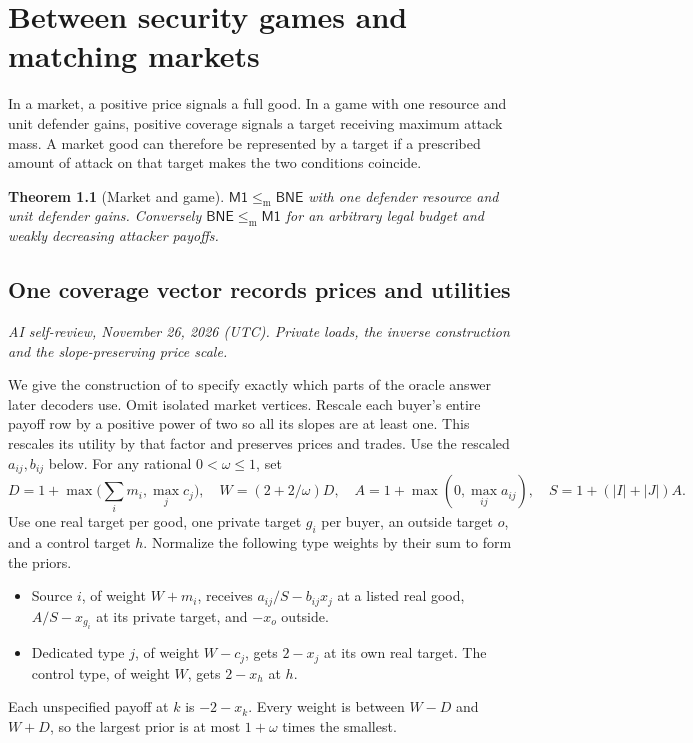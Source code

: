 \documentclass[11pt,oneside,openany,notitlepage]{report}
\newtheorem{theorem}{Theorem}[chapter]
\newcommand{\Market}{\mathsf{M1}}
\newcommand{\BNE}{\mathsf{BNE}}
\newcommand{\dd}{\mathrel{\leq_{\mathrm m}}}
\newcommand{\reviewdate}{November 26, 2026 (UTC)}
\newcommand{\reviewmark}[1]{\par\nopagebreak[4]\noindent
  {\footnotesize\itshape AI self-review, \reviewdate. #1\par}\nobreak\smallskip}
\begin{document}
\chapter{Between security games and matching markets}\label{sec:bridge}

In a market, a positive price signals a full good. In a game with one
resource and unit defender gains, positive coverage signals a target
receiving maximum attack mass. A market good can therefore be represented
by a target if a prescribed amount of attack on that target makes the two
conditions coincide.

\begin{theorem}[Market and game]\label{thm:bridge}
\(\Market\dd\BNE\) with one defender resource and unit defender gains.
Conversely \(\BNE\dd\Market\) for an arbitrary legal budget and weakly
decreasing attacker payoffs.
\end{theorem}

\section{One coverage vector records prices and utilities}
\reviewmark{Private loads, the inverse construction and the slope-preserving price scale.}

We give the construction of \cite[Theorem~3.16]{book} to specify exactly
which parts of the oracle answer later decoders use. Omit isolated market
vertices. Rescale each buyer's entire payoff row by a positive power of
two so all its slopes are at least one. This rescales its utility by that
factor and preserves prices and trades. Use the rescaled \(a_{ij},b_{ij}\)
below. For any rational \(0<\omega\le1\), set
\[
 D=1+\max\bigl(\textstyle\sum_i m_i,\max_j c_j\bigr),\quad
 W=(2+2/\omega)D,\quad A=1+\max(0,\max_{ij}a_{ij}),\quad
 S=1+(|I|+|J|)A .
\]
Use one real target per good, one private target \(g_i\) per buyer, an
outside target \(o\), and a control target \(h\). Normalize the following
type weights by their sum to form the priors.

\begin{itemize}
\item Source \(i\), of weight \(W+m_i\), receives \(a_{ij}/S-b_{ij}x_j\)
at a listed real good, \(A/S-x_{g_i}\) at its private target, and
\(-x_o\) outside.
\item Dedicated type \(j\), of weight \(W-c_j\), gets \(2-x_j\) at its
own real target. The control type, of weight \(W\), gets \(2-x_h\) at \(h\).
\end{itemize}
Each unspecified payoff at \(k\) is \(-2-x_k\). Every weight is between
\(W-D\) and \(W+D\), so the largest prior is at most \(1+\omega\) times
the smallest.
\end{document}
